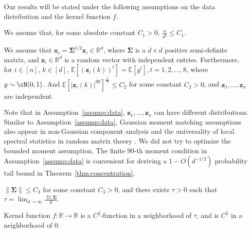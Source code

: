 \documentclass[twoside,11pt]{article}
\newcommand{\R}{\mathbb{R}}
\def\bx{{\boldsymbol x}}
\def\bz{{\boldsymbol z}}
\def\bSigma{{\boldsymbol \Sigma}}
\newcommand{\Tr}{\operatorname{Tr}}
\newcommand{\z}{\boldsymbol{z}}
\newcommand{\1}{\mathbf{1}}
\def\Real{\mathbb{R}}
\begin{document}
Our results will be stated under the following assumptions on the data distribution and the kernel function $f$.
\begin{assumption}\label{assump:ratio}
We assume that, for some absolute  constant $C_1>0$, $\frac{n}{d^{2}}\leq C_1$.
\end{assumption}
 \begin{assumption}\label{assump:data}
We assume that $\bx_i=\bSigma^{1/2} \bz_i\in\R^d$, where $\bSigma$  is a $d\times d$ positive semi-definite  matrix, and $\z_i\in\Real^d$ is a random vector with independent entries. Furthermore, for $i\in [n]$,  $k\in [d]$, 
$\mathbb E[(\bz_{i}(k))^{t}]=\mathbb E[g^t], t=1,2,\dots, 8$, where  $g\sim \cN(0,1)$. And $\mathbb E[|\bz_{i }(k)|^{90}]^{\frac{1}{90}}\leq C_2$  for some constant $C_2> 0$, and $\z_1,\dots,\z_n$ are independent.
\end{assumption}
Note that in Assumption~\ref{assump:data}, $\z_1,\dots,\z_n$ can have different distributions. Similar to Assumption~\ref{assump:data}, Gaussian moment matching assumptions also appear in non-Gaussian component analysis \citep{dudeja2022statistical} and the universality of local spectral statistics in random matrix theory \citep{tao2011random}.  We did not try to optimize the bounded moment assumption. The finite $90$-th moment condition in Assumption~\ref{assump:data} is convenient for deriving a $1-O(d^{-1/2})$ probability tail bound in Theorem~\ref{thm:concentration}.  




\begin{assumption}\label{assump:sigma} $\|\bSigma\|\leq C_3$ for some constant $C_3>0$, and there exists   $\tau>0$ such that 
$\tau=\lim_{d\to\infty} \frac{\Tr\bSigma}{d}$.
\end{assumption}
\begin{assumption}\label{assump:nonlinear_f}
Kernel function $f: \mathbb R \to \mathbb R$ is a $C^{2}$-function in a neighborhood of $\tau$, and is $C^{5}$ in a neighborhood of $0$.
\end{assumption}
\end{document}
